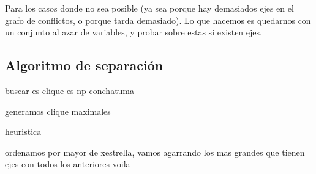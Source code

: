 Para los casos donde no sea posible (ya sea porque hay demasiados ejes en el grafo de conflictos, o porque tarda demasiado). Lo que hacemos es quedarnos
con un conjunto al azar de variables, y probar sobre estas si existen ejes.

\bigskip
\subsection{Algoritmo de separaci\'on}


buscar es clique es np-conchatuma

generamos clique maximales

heuristica

ordenamos por mayor de xestrella, vamos agarrando los mas grandes que tienen ejes con todos los anteriores voila
